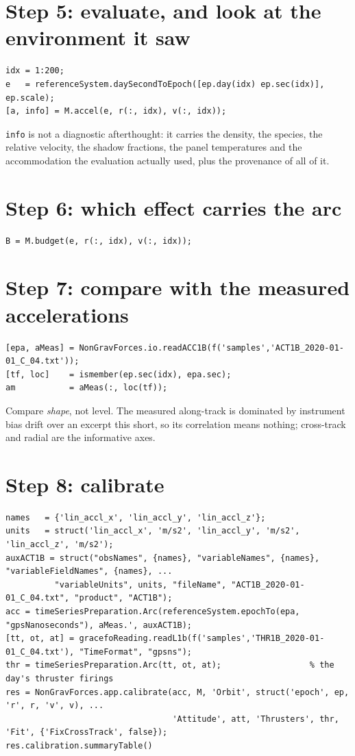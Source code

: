 \documentclass[11pt,a4paper]{report}
\begin{document}
\section{Step 5: evaluate, and look at the environment it saw}
\begin{lstlisting}
idx = 1:200;
e   = referenceSystem.daySecondToEpoch([ep.day(idx) ep.sec(idx)], ep.scale);
[a, info] = M.accel(e, r(:, idx), v(:, idx));
\end{lstlisting}

\noindent \texttt{info} is not a diagnostic afterthought: it carries the density, the species, the
relative velocity, the shadow fractions, the panel temperatures and the accommodation the
evaluation actually used, plus the provenance of all of it.

\section{Step 6: which effect carries the arc}
\begin{lstlisting}
B = M.budget(e, r(:, idx), v(:, idx));
\end{lstlisting}

\section{Step 7: compare with the measured accelerations}
\begin{lstlisting}
[epa, aMeas] = NonGravForces.io.readACC1B(f('samples','ACT1B_2020-01-01_C_04.txt'));
[tf, loc]    = ismember(ep.sec(idx), epa.sec);
am           = aMeas(:, loc(tf));
\end{lstlisting}

\noindent Compare \emph{shape}, not level. The measured along-track is dominated by instrument bias
drift over an excerpt this short, so its correlation means nothing; cross-track and radial are the
informative axes.

\section{Step 8: calibrate}
\label{sec:cal-short}
\begin{lstlisting}
names   = {'lin_accl_x', 'lin_accl_y', 'lin_accl_z'};
units   = struct('lin_accl_x', 'm/s2', 'lin_accl_y', 'm/s2', 'lin_accl_z', 'm/s2');
auxACT1B = struct("obsNames", {names}, "variableNames", {names}, "variableFieldNames", {names}, ...
          "variableUnits", units, "fileName", "ACT1B_2020-01-01_C_04.txt", "product", "ACT1B");
acc = timeSeriesPreparation.Arc(referenceSystem.epochTo(epa, "gpsNanoseconds"), aMeas.', auxACT1B);
[tt, ot, at] = gracefoReading.readL1b(f('samples','THR1B_2020-01-01_C_04.txt'), "TimeFormat", "gpsns");
thr = timeSeriesPreparation.Arc(tt, ot, at);                  % the day's thruster firings
res = NonGravForces.app.calibrate(acc, M, 'Orbit', struct('epoch', ep, 'r', r, 'v', v), ...
                                  'Attitude', att, 'Thrusters', thr, 'Fit', {'FixCrossTrack', false});
res.calibration.summaryTable()
\end{lstlisting}
\end{document}
